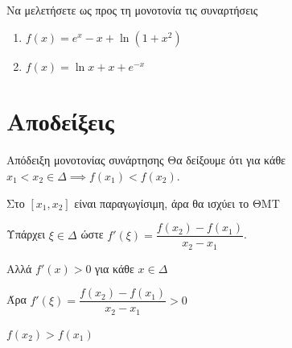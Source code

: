 \documentclass{presentation}
\begin{document}
\begin{askisi}
    Να μελετήσετε ως προς τη μονοτονία τις συναρτήσεις
    \begin{enumerate}
        \item<1-> $f(x)=e^x-x+\ln (1+x^2)$
        \item<2-> $f(x)=\ln x+x+e^{-x}$
    \end{enumerate}

\end{askisi}


\appendix

\section{Αποδείξεις}
\begin{frame}[label=Απόδειξη1]{Απόδειξη μονοτονίας συνάρτησης}
    Θα δείξουμε ότι για κάθε $x_1<x_2\in Δ \implies f(x_1)<f(x_2)$.

     Στο $[x_1,x_2]$ είναι παραγωγίσιμη, άρα θα ισχύει το ΘΜΤ

     Υπάρχει $ξ\in Δ$ ώστε $f'(ξ)=\dfrac{f(x_2)-f(x_1)}{x_2-x_1}$.

     Αλλά $f'(x)>0$ για κάθε $x\in Δ$

     Άρα $f'(ξ)=\dfrac{f(x_2)-f(x_1)}{x_2-x_1}>0$

     $f(x_2)>f(x_1)$

    \hyperlink{Θεώρημα1}{}
\end{frame}
\end{document}
